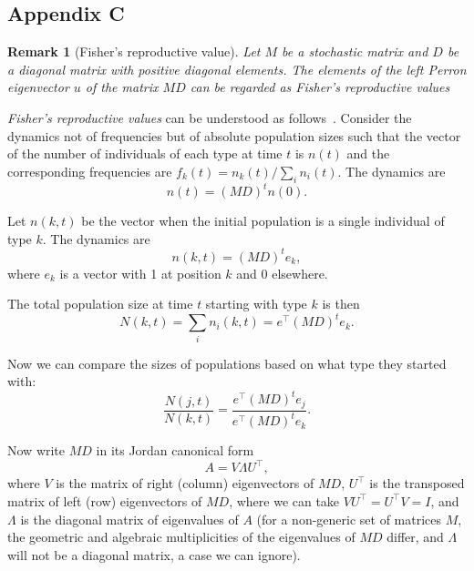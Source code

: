 \documentclass[9pt, a4paper, twocolumn]{extarticle}
\newcommand*{\tr}{^\intercal}
\newtheorem{remark}{Remark}
\begin{document}
\subsection*{Appendix C}\label{sec:AppC}
\begin{remark}[Fisher's reproductive value]
Let $M$ be a stochastic matrix and $D$ be a diagonal matrix with positive diagonal elements. 
The elements of the left \emph{Perron} eigenvector $u$ of the matrix $MD$ can be regarded as \emph{Fisher's reproductive values}~\citep[pg.~27]{Fisher1930}
\end{remark}

\emph{Fisher's reproductive values} can be understood as follows~\citep[ch.~10]{Grafen2006,Otto2007}.
Consider the dynamics not of frequencies but of absolute population sizes such that the vector of the number of individuals of each type at time $t$ is $n(t)$ and the corresponding frequencies are $f_k(t) = n_k(t) / \sum_i{n_i(t)}$.
The dynamics are
\begin{equation}
n(t) = (MD)^t n(0).
\end{equation}

Let $n(k, t)$ be the vector when the initial population is a single individual of type $k$.
The dynamics are
\begin{equation}
n(k,t) = (MD)^t e_k,
\end{equation}
where $e_k$ is a vector with 1 at position $k$ and 0 elsewhere.

The total population size at time $t$ starting with type $k$ is then
\begin{equation}
N(k,t) = \sum_i{n_i(k,t)} = e\tr (MD)^t e_k.
\end{equation}

Now we can compare the sizes of populations based on what type they started
with:
\begin{equation}
\frac{N(j,t)}{N(k,t)} = \frac{e\tr (MD)^t e_j}{e\tr (MD)^t e_k}.
\end{equation}

Now write $MD$ in its Jordan canonical form 
\begin{equation}
A = V \Lambda U\tr,
\end{equation}
where $V$ is the matrix of right (column) eigenvectors of $MD$,
$U\tr$ is the transposed matrix of left (row) eigenvectors of $MD$,
where we can take $V U\tr = U\tr V = I$, 
and $\Lambda$ is the diagonal matrix of eigenvalues of $A$ 
(for a non-generic set of matrices $M$, the geometric and algebraic multiplicities of the eigenvalues of $MD$ differ, and $\Lambda$ will not be a diagonal matrix, a case we can ignore).
\end{document}
